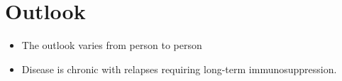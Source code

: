 \section{Outlook}
\begin{itemize}[noitemsep]
  \item The outlook varies from person to person
  \item Disease is chronic with relapses requiring long-term immunosuppression.
\end{itemize}
